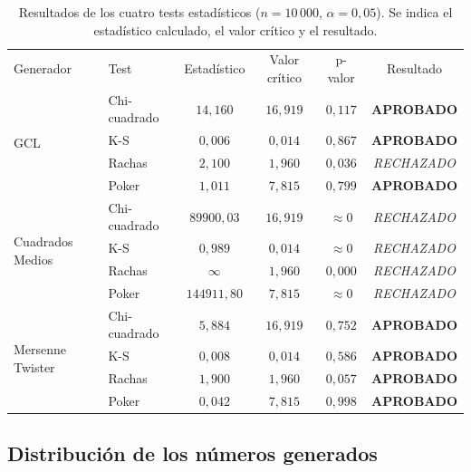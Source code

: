 \documentclass[a4paper, 11pt]{article}
\begin{document}
\begin{table}[H]
  \centering
  \caption{Resultados de los cuatro tests estadísticos ($n = 10\,000$, $\alpha = 0{,}05$).
    Se indica el estadístico calculado, el valor crítico y el resultado.}
  \label{tab:resultados}
  \small
  \begin{tabular}{llcccc}
    \toprule
    \multirow{2}{*}{Generador} & \multirow{2}{*}{Test} &
      \multirow{2}{*}{Estadístico} & \multirow{2}{*}{Valor crítico} &
      \multirow{2}{*}{p-valor} & \multirow{2}{*}{Resultado} \\
    & & & & & \\
    \midrule
    \multirow{4}{*}{GCL}
      & Chi-cuadrado    & $14{,}160$ & $16{,}919$ & $0{,}117$ & \textbf{APROBADO} \\
      & K-S             & $0{,}006$  & $0{,}014$  & $0{,}867$ & \textbf{APROBADO} \\
      & Rachas          & $2{,}100$  & $1{,}960$  & $0{,}036$ & \textit{RECHAZADO} \\
      & Poker           & $1{,}011$  & $7{,}815$  & $0{,}799$ & \textbf{APROBADO} \\
    \midrule
    \multirow{4}{*}{Cuadrados Medios}
      & Chi-cuadrado    & $89900{,}03$ & $16{,}919$ & $\approx 0$ & \textit{RECHAZADO} \\
      & K-S             & $0{,}989$  & $0{,}014$  & $\approx 0$ & \textit{RECHAZADO} \\
      & Rachas          & $\infty$   & $1{,}960$  & $0{,}000$ & \textit{RECHAZADO} \\
      & Poker           & $144911{,}80$ & $7{,}815$ & $\approx 0$ & \textit{RECHAZADO} \\
    \midrule
    \multirow{4}{*}{Mersenne Twister}
      & Chi-cuadrado    & $5{,}884$  & $16{,}919$ & $0{,}752$ & \textbf{APROBADO} \\
      & K-S             & $0{,}008$  & $0{,}014$  & $0{,}586$ & \textbf{APROBADO} \\
      & Rachas          & $1{,}900$  & $1{,}960$  & $0{,}057$ & \textbf{APROBADO} \\
      & Poker           & $0{,}042$  & $7{,}815$  & $0{,}998$ & \textbf{APROBADO} \\
    \bottomrule
  \end{tabular}
\end{table}

\subsection{Distribución de los números generados}
\end{document}
